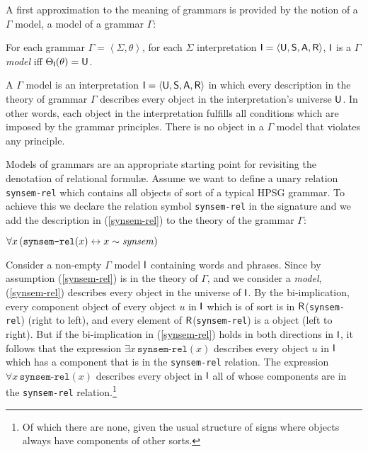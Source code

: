 \documentclass[output=paper
                ,modfonts
                ,nonflat
	        ,collection
	        ,collectionchapter
	        ,collectiontoclongg
 	        ,biblatex
                ,babelshorthands
                ,newtxmath
                ,draftmode
                ,colorlinks, citecolor=brown
]{./langsci/langscibook}
\begin{document}
{{A first approximation to the meaning of grammars is provided by the notion
of a $\Gamma$ model, a model of a grammar $\Gamma$:

\begin{mydef}\label{def-rsrl-model}
For each grammar $\Gamma = \left< \Sigma, \theta \right>$,
for each $\Sigma$ interpretation $\mathsf{I}=\langle\mathsf{U},\mathsf{S},\mathsf{A},\mathsf{R}\rangle$,
$\mathsf{I}$
is a \emph{$\Gamma$ model} iff
\(\Theta_{\mathsf{I}}(\theta) =\mathsf{U}\).
\end{mydef}

A $\Gamma$ model is an interpretation $\mathsf{I}=\langle\mathsf{U},\mathsf{S},\mathsf{A},\mathsf{R}\rangle$ in which
every description in the theory of grammar $\Gamma$ describes every object
in the interpretation's universe $\mathsf{U}$. In other words, each object
in the interpretation fulfills all conditions which are imposed by
the grammar principles. There is no object in a $\Gamma$ model that
violates any principle.

Models of grammars are an appropriate starting point for revisiting the
denotation of relational formul\ae. Assume we want to define a unary
relation \texttt{synsem-rel} which contains all objects of sort
 of a typical HPSG grammar. To achieve this we declare the
relation symbol \texttt{synsem-rel} in the signature and we add the
description in (\ref{synsem-rel}) to the theory of the grammar $\Gamma$:

\begin{exe}
  \ex\label{synsem-rel}
  $\forall x \left(\texttt{synsem-rel}(x)\leftrightarrow x\sim\mbox{{\normalfont\itshape synsem\/}}\right)$
\end{exe}

Consider a non-empty $\Gamma$ model $\mathsf{I}$ containing words and
phrases. Since by assumption (\ref{synsem-rel}) is in the theory of
$\Gamma$, and we consider a \emph{model}, (\ref{synsem-rel}) describes
every object in the universe of $\mathsf{I}$.  By the bi-implication, every
component object of every object $u$ in $\mathsf{I}$ which is of sort
 is in $\mathsf{R}$(\texttt{synsem-rel}) (right to left), and
every element of $\mathsf{R}$(\texttt{synsem-rel}) is a 
object (left to right). But if the bi-implication in
(\ref{synsem-rel}) holds in both directions in $\mathsf{I}$, it follows
that the expression $\exists x\,\texttt{synsem-rel}(x)$ describes
every object $u$ in $\mathsf{I}$ which has a component that is in the
\texttt{synsem-rel} relation. The expression $\forall
x\,\texttt{synsem-rel}(x)$ describes every object in $\mathsf{I}$ all of
whose components are in the \texttt{synsem-rel} relation.\footnote{Of
  which there are none, given the usual structure of signs where
   objects always have components of other sorts.}

}}
\end{document}
